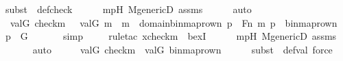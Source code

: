 \begin{isabellebody}
{\isacharparenleft}{\kern0pt}subst\ {\isacharparenleft}{\kern0pt}{}{\isacharparenright}{\kern0pt}\ def{\isacharunderscore}{\kern0pt}check{\isacharparenright}{\kern0pt}\isanewline
\ \ \ \ \isamarkupfalse%
\ mpH\ M{\isacharunderscore}{\kern0pt}genericD\ assms\isanewline
\ \ \ \ \isamarkupfalse%
\ auto\isanewline
\ \ \isamarkupfalse%
\ \isamarkupfalse%
\ {\isachardoublequoteopen}val{\isacharparenleft}{\kern0pt}G{\isacharcomma}{\kern0pt}\ check{\isacharparenleft}{\kern0pt}m{\isacharparenright}{\kern0pt}{\isacharparenright}{\kern0pt}\ {\isasymin}\ {\isacharbraceleft}{\kern0pt}\ val{\isacharparenleft}{\kern0pt}G{\isacharcomma}{\kern0pt}\ m{\isacharparenright}{\kern0pt}\ {\isachardot}{\kern0pt}{\isachardot}{\kern0pt}\ m\ {\isasymin}\ domain{\isacharparenleft}{\kern0pt}binmap{\isacharunderscore}{\kern0pt}row{\isacharprime}{\kern0pt}{\isacharparenleft}{\kern0pt}n{\isacharparenright}{\kern0pt}{\isacharparenright}{\kern0pt}{\isacharcomma}{\kern0pt}\ {\isasymexists}p\ {\isasymin}\ Fn{\isachardot}{\kern0pt}\ {\isasymlangle}m{\isacharcomma}{\kern0pt}\ p{\isasymrangle}\ {\isasymin}\ binmap{\isacharunderscore}{\kern0pt}row{\isacharprime}{\kern0pt}{\isacharparenleft}{\kern0pt}n{\isacharparenright}{\kern0pt}\ {\isasymand}\ p\ {\isasymin}\ G\ {\isacharbraceright}{\kern0pt}{\isachardoublequoteclose}\isanewline
\ \ \ \ \isamarkupfalse%
\ simp\isanewline
\ \ \ \ \isamarkupfalse%
{\isacharparenleft}{\kern0pt}rule{\isacharunderscore}{\kern0pt}tac\ x{\isacharequal}{\kern0pt}{\isachardoublequoteopen}check{\isacharparenleft}{\kern0pt}m{\isacharparenright}{\kern0pt}{\isachardoublequoteclose}\ \ bexI{\isacharparenright}{\kern0pt}\isanewline
\ \ \ \ \isamarkupfalse%
\ mpH\ M{\isacharunderscore}{\kern0pt}genericD\ assms\isanewline
\ \ \ \ \isamarkupfalse%
\ auto\isanewline
\ \ \isamarkupfalse%
\ \isamarkupfalse%
\ {\isachardoublequoteopen}val{\isacharparenleft}{\kern0pt}G{\isacharcomma}{\kern0pt}\ check{\isacharparenleft}{\kern0pt}m{\isacharparenright}{\kern0pt}{\isacharparenright}{\kern0pt}\ {\isasymin}\ val{\isacharparenleft}{\kern0pt}G{\isacharcomma}{\kern0pt}\ binmap{\isacharunderscore}{\kern0pt}row{\isacharprime}{\kern0pt}{\isacharparenleft}{\kern0pt}n{\isacharparenright}{\kern0pt}{\isacharparenright}{\kern0pt}{\isachardoublequoteclose}\ \isanewline
\ \ \ \ \isamarkupfalse%
{\isacharparenleft}{\kern0pt}subst\ {\isacharparenleft}{\kern0pt}{}{\isacharparenright}{\kern0pt}\ def{\isacharunderscore}{\kern0pt}val{\isacharcomma}{\kern0pt}\ force{\isacharparenright}{\kern0pt}\isanewline

\end{isabellebody}
